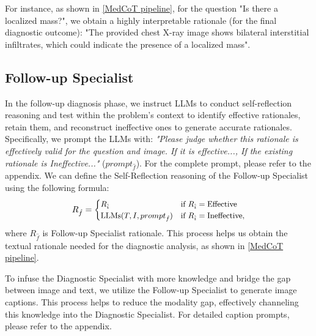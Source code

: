 \documentclass[11pt]{article}
\begin{document}
For instance, as shown in \autoref{MedCoT pipeline}, for the question "Is there a localized mass?", we obtain a highly interpretable rationale (for the final diagnostic outcome): "The provided chest X-ray image shows bilateral interstitial infiltrates, which could indicate the presence of a localized mass".
\subsection{Follow-up Specialist}
In the follow-up diagnosis phase, we instruct LLMs to conduct self-reflection reasoning and test within the problem's context to identify effective rationales, retain them, and reconstruct ineffective ones to generate accurate rationales. Specifically, we prompt the LLMs with:
\textit{"Please judge whether this rationale is effectively valid for the question and image. If it is effective..., If the existing rationale is Ineffective..."} ($prompt_{\hat{f}}$). For the complete prompt, please refer to the appendix. We can define the Self-Reflection reasoning of the Follow-up Specialist using the following formula:
\begin{equation}
\begin{small}
R_{\hat{f}} = 
\begin{cases} 
R_{\hat{i}} & \text{if } R_{\hat{i}} = \text{Effective} \\
\text{LLMs}(T, I, {prompt}_{\hat{f}}) & \text{if } R_{\hat{i}} = \text{Ineffective},
\end{cases}
\end{small}
\end{equation}
where $R_{\hat{f}}$ is Follow-up Specialist rationale. This process helps us obtain the textual rationale needed for the diagnostic analysis, as shown in \autoref{MedCoT pipeline}.

To infuse the Diagnostic Specialist with more knowledge and bridge the gap between image and text, we utilize the Follow-up Specialist to generate image captions. This process helps to reduce the modality gap, effectively channeling this knowledge into the Diagnostic Specialist. For detailed caption prompts, please refer to the appendix.

\end{document}
